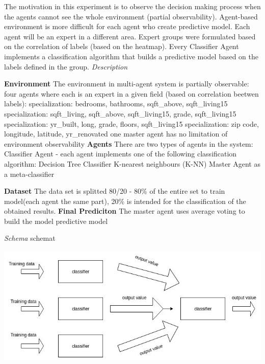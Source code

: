 \begin{enumerate}
The motivation in this experiment is to observe the decision making process when the agents cannot see the whole environment (partial observability). Agent-based environment is more difficult for each agent who create predictive model. Each agent will be an expert in a different area. 
Expert groups were formulated based on the correlation of labels (based on the heatmap). Every Classifier Agent implements a classification algorithm that builds a predictive model based on the labels defined in the group.
\newline \newline
\textit{Description}
\begin{outline}[enumerate]
	\1 \textbf{Environment} \newline
	The environment in multi-agent system is partially observable:
		\2 four agents where each is an expert in a given field (based on correlation beetwen labels):
			\3 specialization: bedrooms, bathrooms, sqft\_above, sqft\_living15
			\3 specialization: sqft\_living, sqft\_above, sqft\_living15, grade, sqft\_living15 
			\3 specialization: yr\_built, long, grade, floors, sqft\_living15 
			\3 specialization: zip code, longitude, latitude, yr\_renovated   
		\2 one master agent has no limitation of environment observability
	\1 \textbf{Agents}
	\newline
	There are two types of agents in the system:
	\2 Classifier Agent - each agent implements one of the following classification algorithm:
		\3 Decision Tree Classifier
		\3 K-nearest neighbours (K-NN)
	\2 Master Agent	as a meta-classifier	
	
	\1 \textbf{Dataset}
	\newline
	The data set is splitted 80/20 - 80\% of the entire set to train model(each agent the same part), 20\% is intended for the classification of the obtained results.
	\1 \textbf{Final Prediciton}
	\newline
	The master agent uses average voting to build the model predictive model
\end{outline}

\textit{Schema}
\newline schemat

\begin{center}
	\includegraphics[width=1\textwidth, keepaspectratio]{diagrams/example.jpg}
	\center
	\label{fig:exp1_schema}
\end{center}


\end{enumerate}
